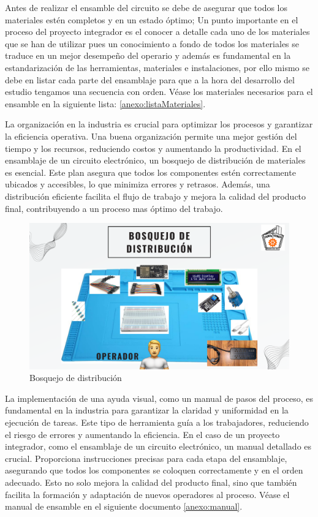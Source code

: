     Antes de realizar el ensamble del circuito se debe de asegurar que todos los materiales estén completos y en un estado óptimo; Un punto importante en el proceso del proyecto integrador es el conocer a detalle cada uno de los materiales que se han de utilizar pues un conocimiento a fondo de todos los materiales se traduce en un mejor desempeño del operario y además es fundamental en la estandarización de las herramientas, materiales e instalaciones, por ello mismo se debe en listar cada parte del ensamblaje para que a la hora del desarrollo del estudio tengamos una secuencia con orden. Véase los materiales necesarios para el ensamble en la siguiente lista: \ref{anexo:listaMateriales}.
    
    La organización en la industria es crucial para optimizar los procesos y garantizar la eficiencia operativa. Una buena organización permite una mejor gestión del tiempo y los recursos, reduciendo costos y aumentando la productividad. En el ensamblaje de un circuito electrónico, un bosquejo de distribución de materiales es esencial. Este plan asegura que todos los componentes estén correctamente ubicados y accesibles, lo que minimiza errores y retrasos. Además, una distribución eficiente facilita el flujo de trabajo y mejora la calidad del producto final, contribuyendo a un proceso mas óptimo del trabajo. 
    \begin{figure}[H]
        \centering
        \includegraphics[scale=0.16]{35/Img/bosquejoDistribucion.pdf}
        \caption{Bosquejo de distribución}
        \label{fig:bosquejoDistribucion}
    \end{figure}
    
    La implementación de una ayuda visual, como un manual de pasos del proceso, es fundamental en la industria para garantizar la claridad y uniformidad en la ejecución de tareas. Este tipo de herramienta guía a los trabajadores, reduciendo el riesgo de errores y aumentando la eficiencia. En el caso de un proyecto integrador, como el ensamblaje de un circuito electrónico, un manual detallado es crucial. Proporciona instrucciones precisas para cada etapa del ensamblaje, asegurando que todos los componentes se coloquen correctamente y en el orden adecuado. Esto no solo mejora la calidad del producto final, sino que también facilita la formación y adaptación de nuevos operadores al proceso.
    Véase el manual de ensamble en el siguiente documento \ref{anexo:manual}.
    
